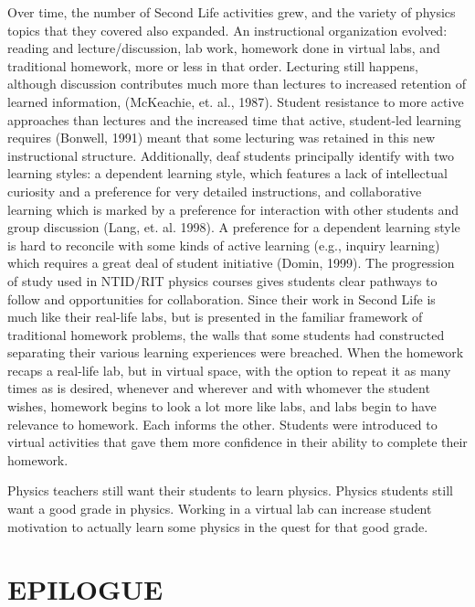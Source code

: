 \documentclass[11.5pt]{sig-alternate} %
\begin{document}
\begin{large}
Over time, the number of Second Life activities grew, and the variety of physics topics that they covered also expanded. An instructional organization evolved: reading and lecture/discussion, lab work, homework done in virtual labs, and traditional homework, more or less in that order. Lecturing still happens, although discussion contributes much more than lectures to increased retention of learned information, (McKeachie, et. al., 1987). Student resistance to more active approaches than lectures and the increased time that active, student-led learning requires (Bonwell, 1991) meant that some lecturing was retained in this new instructional structure. Additionally, deaf students principally identify with two learning styles: a dependent learning style, which features a lack of intellectual curiosity and a preference for very detailed instructions, and collaborative learning which is marked by a preference for interaction with other students and group discussion (Lang, et. al. 1998). A preference for a dependent learning style is hard to reconcile with some kinds of active learning (e.g., inquiry learning) which requires a great deal of student initiative (Domin, 1999). The progression of study used in NTID/RIT physics courses gives students clear pathways to follow and opportunities for collaboration. Since their work in Second Life is much like their real-life labs, but is presented in the familiar framework of traditional homework problems, the walls that some students had constructed separating their various learning experiences were breached. When the homework recaps a real-life lab, but in virtual space, with the option to repeat it as many times as is desired, whenever and wherever and with whomever the student wishes, homework begins to look a lot more like labs, and labs begin to have relevance to homework. Each informs the other. Students were introduced to virtual activities that gave them more confidence in their ability to complete their homework.

Physics teachers still want their students to learn physics. Physics students still want a good grade in physics. Working in a virtual lab can increase student motivation to actually learn some physics in the quest for that good grade.

\section*{EPILOGUE}


\end{large}
\end{document}

